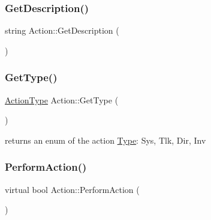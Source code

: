 \subsubsection{\texorpdfstring{Get\+Description()}{GetDescription()}}
{\footnotesize\ttfamily string Action\+::\+Get\+Description (\begin{DoxyParamCaption}{ }\end{DoxyParamCaption})}

\mbox{\label{class_action_ab80590fc9e96653a15f28f4aaff1a13c}} 
\subsubsection{\texorpdfstring{Get\+Type()}{GetType()}}
{\footnotesize\ttfamily \mbox{\hyperlink{_action_8h_a21d5e8f8cdaa838586b31007df0a950b}{Action\+Type}} Action\+::\+Get\+Type (\begin{DoxyParamCaption}{ }\end{DoxyParamCaption})}



returns an enum of the action \mbox{\hyperlink{class_type}{Type}}\+: \textquotesingle{}Sys, Tlk, Dir, Inv\textquotesingle{} 

\mbox{\label{class_action_a4a775577f8bb8673d34f21bded80b55f}} 
\subsubsection{\texorpdfstring{Perform\+Action()}{PerformAction()}\hspace{0.1cm}{\footnotesize\ttfamily [1/7]}}
{\footnotesize\ttfamily virtual bool Action\+::\+Perform\+Action (\begin{DoxyParamCaption}{ }\end{DoxyParamCaption})\hspace{0.3cm}{\ttfamily [pure virtual]}}

\mbox{\label{class_action_a0e4daa8818c231a463cb728fb12f5424}} 
